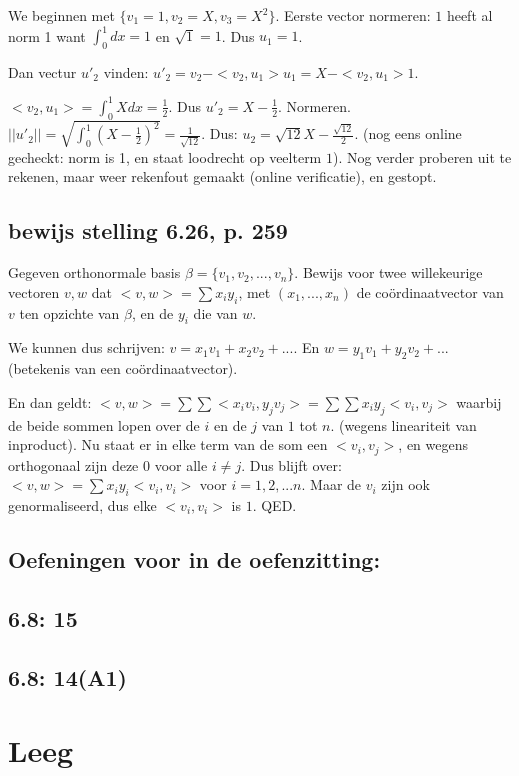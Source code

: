 \documentclass{article}
\begin{document}
We beginnen met $\{ v_1=1, v_2=X, v_3=X^2 \}$. 
Eerste vector normeren: $1$ heeft al norm 1 want $\int_0^1 dx = 1$ en $\sqrt{1}=1$. Dus $u_1=1$. 

Dan vectur $u'_2$ vinden: $u'_2 = v_2 - < v_2 , u_1> u_1 = X - <v_2,u_1> 1$.

$<v_2,u_1> = \int_0^1 X dx = \frac{1}{2}$. 
Dus $u'_2 = X - \frac{1}{2}$. 
Normeren. 
$|| u'_2 || = \sqrt{ \int_0^1 (X - \frac{1}{2})^2 } = \frac{1}{\sqrt{12}}$. 
Dus: $u_2 = \sqrt{12}X - \frac{\sqrt{12}}{2} $. 
(nog eens online gecheckt: norm is 1, en staat loodrecht op veelterm $1$). 
Nog verder proberen uit te rekenen, maar weer rekenfout gemaakt (online verificatie), en gestopt. 


\subsection*{bewijs stelling 6.26, p. 259}
Gegeven orthonormale basis $\beta=\{ v_1, v_2, ..., v_n\}$. 
Bewijs voor twee willekeurige vectoren $v,w$ dat $<v,w> = \sum x_i y_i$, met $(x_1,...,x_n)$ de co\"ordinaatvector van $v$ ten opzichte van $\beta$, en de $y_i$ die van $w$. 

We kunnen dus schrijven: $v = x_1v_1 + x_2v_2 +...$. En $w = y_1v_1 + y_2v_2 +...$ (betekenis van een co\"ordinaatvector). 

En dan geldt: $<v,w> = \sum \sum <x_i v_i , y_j v_j > = \sum \sum x_i y_j < v_i , v_j >$ waarbij de beide sommen lopen over de $i$ en de $j$ van $1$ tot $n$. (wegens lineariteit van inproduct). 
Nu staat er in elke term van de som een $<v_i , v_j>$, en wegens orthogonaal zijn deze $0$ voor alle $i \neq j$. Dus blijft over:  $<v,w> = \sum x_i y_i < v_i , v_i >$ voor $i=1,2,...n$. Maar de $v_i$ zijn ook genormaliseerd, dus elke $< v_i , v_i >$ is $1$. QED. 

\subsection*{Oefeningen voor in de oefenzitting: }

\subsection*{6.8: 15} 

\subsection*{6.8: 14(A1)} 
    

\section{Leeg} 
\end{document}
